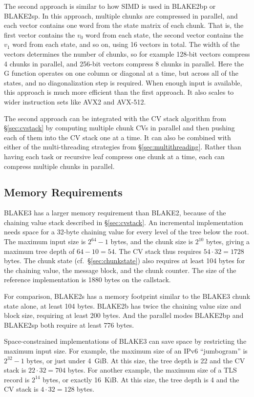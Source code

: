 \documentclass[11pt,notitlepage,a4paper]{article}
\begin{document}
The second approach is similar to how SIMD is used in BLAKE2bp or BLAKE2sp. In
this approach, multiple chunks are compressed in parallel, and each vector
contains one word from the state matrix of each chunk. That is, the first
vector contains the $v_0$ word from each state, the second vector contains the
$v_1$ word from each state, and so on, using 16 vectors in total. The width of
the vectors determines the number of chunks, so for example 128-bit vectors
compress 4 chunks in parallel, and 256-bit vectors compress 8 chunks in
parallel. Here the G function operates on one column or diagonal at a time, but
across all of the states, and no diagonalization step is required. When enough
input is available, this approach is much more efficient than the first
approach. It also scales to wider instruction sets like AVX2 and AVX-512.

The second approach can be integrated with the CV stack algorithm from
\S\ref{sec:cvstack} by computing multiple chunk CVs in parallel and then
pushing each of them into the CV stack one at a time. It can also be combined
with either of the multi-threading strategies from \S\ref{sec:multithreading}.
Rather than having each task or recursive leaf compress one chunk at a time,
each can compress multiple chunks in parallel.

\subsection{Memory Requirements}\label{sec:memory}

BLAKE3 has a larger memory requirement than BLAKE2, because of the chaining
value stack described in \S\ref{sec:cvstack}. An incremental implementation
needs space for a 32-byte chaining value for every level of the tree below the
root. The maximum input size is $2^{64}-1$ bytes, and the chunk size is
$2^{10}$ bytes, giving a maximum tree depth of $64 - 10 = 54$. The CV stack
thus requires $54 \cdot 32 = 1728$ bytes. The chunk state
(cf.~\S\ref{sec:chunkstate}) also requires at least 104 bytes for the chaining
value, the message block, and the chunk counter. The size of the reference
implementation is 1880 bytes on the callstack.

For comparison, BLAKE2s has a memory footprint similar to the BLAKE3 chunk
state alone, at least 104 bytes. BLAKE2b has twice the chaining value size and
block size, requiring at least 200 bytes. And the parallel modes BLAKE2bp and
BLAKE2sp both require at least 776 bytes.

Space-constrained implementations of BLAKE3 can save space by restricting the
maximum input size. For example, the maximum size of an IPv6 ``jumbogram'' is
$2^{32}-1$ bytes, or just under 4~GiB. At this size, the tree depth is 22 and
the CV stack is $22 \cdot 32 = 704$ bytes. For another example, the maximum
size of a TLS record is $2^{14}$ bytes, or exactly 16~KiB. At this size, the
tree depth is 4 and the CV stack is $4 \cdot 32 = 128$ bytes.
\end{document}
